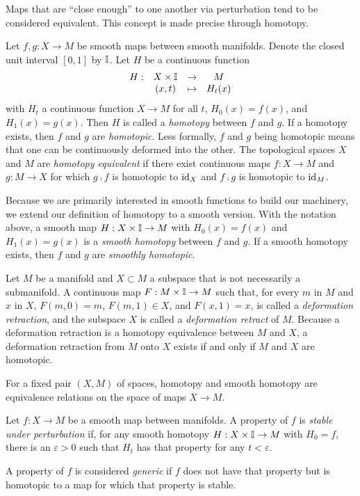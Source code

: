 Maps that are ``close enough'' to one another via perturbation tend to be considered equivalent.
This concept is made precise through homotopy.

\begin{defn}[Homotopy]
	\label{def:homotopy}
	Let $f,g:X\to M$ be smooth maps between smooth manifolds.
	Denote the closed unit interval $[0,1]$ by $\mathbb{I}$.
	Let $H$ be a continuous function 
	\[
		\begin{array}{cccc}
			H: & X\times \mathbb{I} & \to & M \\
			& (x,t)	& \mapsto & H_t(x)
		\end{array}
	\]
	with $H_t$ a continuous function $X\to M$ for all $t$, $H_0(x)=f(x)$, and $H_1(x)=g(x)$.
	Then $H$ is called a \emph{homotopy} between $f$ and $g$.
	If a homotopy exists, then $f$ and $g$ are \emph{homotopic}.
	Less formally, $f$ and $g$ being homotopic means that one can be continuously deformed into the other.
	The topological spaces $X$ and $M$ are \emph{homotopy equivalent} if there exist continuous maps $f:X\to M$ and $g:M\to X$ for which $g\comp f$ is homotopic to $\textrm{id}_{X}$ and $f\comp g$ is homotopic to $\textrm{id}_{M}$.
	
	Because we are primarily interested in smooth functions to build our machinery, we extend our definition of homotopy to a smooth version.
	With the notation above, a smooth map $H:X\times\mathbb{I}\to M$ with $H_0(x)=f(x)$ and $H_1(x)=g(x)$ is a \emph{smooth homotopy} between $f$ and $g$.
	If a smooth homotopy exists, then $f$ and $g$ are \emph{smoothly homotopic}.
	
	Let $M$ be a manifold and $X\subset M$ a subspace that is not necessarily a submanifold.
	A continuous map $F:M\times\mathbb{I}\to M$ such that, for every $m$ in $M$ and $x$ in $X$, $F(m,0)=m$, $F(m,1)\in X$, and $F(x,1)=x$, is called a \emph{deformation retraction}, and the subspace $X$ is called a \emph{deformation retract} of $M$.
	Because a deformation retraction is a homotopy equivalence between $M$ and $X$, a deformation retraction from $M$ onto $X$ exists if and only if $M$ and $X$ are homotopic.
\end{defn}

\begin{prop}
	For a fixed pair $(X,M)$ of spaces, homotopy and smooth homotopy are equivalence relations on the space of maps $X\to M$.
\end{prop}

\begin{defn}
	Let $f:X\to M$ be a smooth map between manifolds.
	A property of $f$ is \emph{stable under perturbation} if, for any smooth homotopy $H:X\times \mathbb{I}\to M$ with $H_0=f$, there is an $\varepsilon>0$ such that $H_t$ has that property for any $t<\varepsilon$.
	
	A property of $f$ is considered \emph{generic} if $f$ does not have that property but is homotopic to a map for which that property is stable.
\end{defn}

